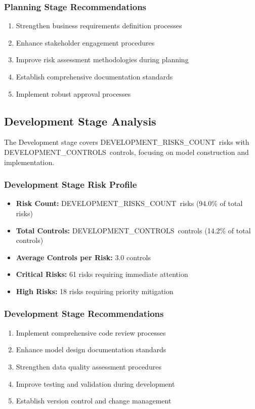\documentclass[11pt,a4paper]{article}
\newcommand{\developmentriskscount}{{{DEVELOPMENT_RISKS_COUNT}}}
\newcommand{\developmentcontrols}{{{DEVELOPMENT_CONTROLS}}}
\begin{document}
\subsubsection{Planning Stage Recommendations}
\begin{enumerate}
\item Strengthen business requirements definition processes
\item Enhance stakeholder engagement procedures
\item Improve risk assessment methodologies during planning
\item Establish comprehensive documentation standards
\item Implement robust approval processes
\end{enumerate}

\subsection{Development Stage Analysis}

The Development stage covers \developmentriskscount\ risks with \developmentcontrols\ controls, focusing on model construction and implementation.

\subsubsection{Development Stage Risk Profile}
\begin{itemize}
\item \textbf{Risk Count:} \developmentriskscount\ risks (94.0\% of total risks)
\item \textbf{Total Controls:} \developmentcontrols\ controls (14.2\% of total controls)
\item \textbf{Average Controls per Risk:} 3.0 controls
\item \textbf{Critical Risks:} 61 risks requiring immediate attention
\item \textbf{High Risks:} 18 risks requiring priority mitigation
\end{itemize}

\subsubsection{Development Stage Recommendations}
\begin{enumerate}
\item Implement comprehensive code review processes
\item Enhance model design documentation standards
\item Strengthen data quality assessment procedures
\item Improve testing and validation during development
\item Establish version control and change management
\end{enumerate}
\end{document}
